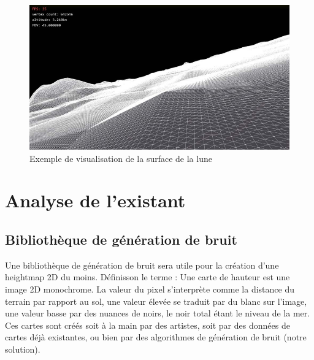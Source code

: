 \documentclass[12pt]{report}
\begin{document}
\vspace{0.3cm}

 \begin{figure}[h]
\centering
\includegraphics[scale = 0.4]{images/Capture d’écran du 2022-03-05 15-46-04.png}
\caption{Exemple de visualisation de la surface de la lune}
\end{figure}

\newpage

\chapter{Analyse de l'existant}

\section{Bibliothèque de génération de bruit}

Une bibliothèque de génération de bruit sera utile pour la création d'une heightmap 2D du moins. Définisson le terme : Une carte de hauteur est une image 2D monochrome. La valeur du pixel s'interprète comme la distance du terrain par rapport au sol, une valeur élevée se traduit par du blanc sur l'image, une valeur basse par des nuances de noirs, le noir total étant le niveau de la mer. Ces cartes sont créés soit à la main par des artistes, soit par des données de cartes déjà existantes, ou bien par des algorithmes de génération de bruit (notre solution).
\end{document}
